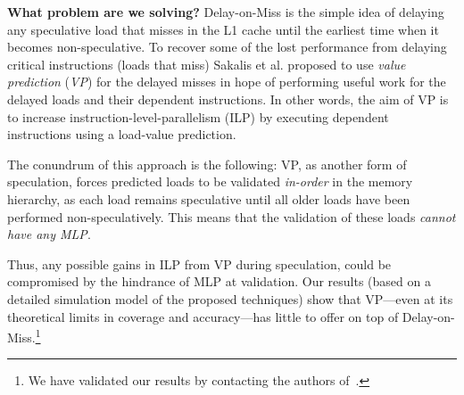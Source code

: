 \noindent \textbf{What problem are we solving?} Delay-on-Miss is the simple idea of delaying any speculative load that misses in the L1 cache until the earliest time when it becomes non-speculative. 
To recover some of the lost performance from delaying critical instructions (loads that miss) Sakalis et al. proposed to use \emph{value prediction} (\emph{VP}) for the delayed misses in hope of performing useful work for the delayed loads and their dependent instructions. In other words, the aim of VP is to increase instruction-level-parallelism (ILP) by executing dependent instructions using a load-value prediction. 

The conundrum of this approach is the following: VP, as another form of speculation, forces predicted loads to be validated \emph{in-order} in the memory hierarchy, as each load remains speculative until all older loads have been performed non-speculatively. This means that the validation of these loads \emph{cannot have any MLP}. 
%
%
Thus, any possible gains in ILP from VP during speculation, could be compromised by the hindrance of MLP at validation.
{
Our results (based on a detailed simulation model of the proposed techniques) show that VP---even at its theoretical limits in coverage and accuracy---has little to offer on top of Delay-on-Miss.\footnote{We have 
validated our results by contacting the authors of~\cite{sakalis+:ISCA2019vp}.}}

